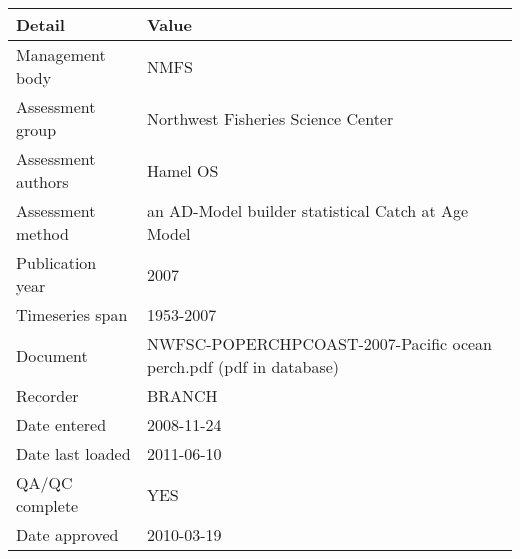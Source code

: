 \begin{table}[htb]
\centering
\begin{tabular}{lp{7cm}}
\toprule
Detail & Value \\
\midrule
Management body    & NMFS                                                               \\
Assessment group   & Northwest Fisheries Science Center                                 \\
Assessment authors & Hamel OS                                                           \\
Assessment method  & an AD-Model builder statistical Catch at Age Model                 \\
Publication year   & 2007                                                               \\
Timeseries span    & 1953-2007                                                          \\
Document           & NWFSC-POPERCHPCOAST-2007-Pacific ocean perch.pdf (pdf in database) \\
Recorder           & BRANCH                                                             \\
Date entered       & 2008-11-24                                                         \\
Date last loaded   & 2011-06-10                                                         \\
QA/QC complete     & YES                                                                \\
Date approved      & 2010-03-19                                                         \\
\bottomrule
\end{tabular}
\label{tab:assessdet}
\end{table}
